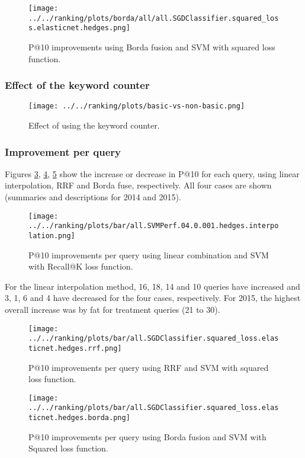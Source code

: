 \begin{figure}
\centerline{
  \texttt{[image: ../../ranking/plots/borda/all/all.SGDClassifier.squared\_loss.elasticnet.hedges.png]}
  }
  \caption{P@10 improvements using Borda fusion and SVM with squared loss function.}
  \label{borda-weight}
\end{figure}

\subsubsection{Effect of the keyword counter}
\begin{figure}[h!]
\centerline{
  \texttt{[image: ../../ranking/plots/basic-vs-non-basic.png]}
  }
  \caption{Effect of using the keyword counter.}
  \label{basic-effect-plot}
\end{figure}

\subsubsection{Improvement per query}

Figures \ref{interp-query}, \ref{rrf-query}, \ref{borda-query} show the increase or decrease in P@10 for each query,
using linear interpolation, RRF and Borda fuse, respectively. All four cases are shown (summaries and descriptions for 2014 and 2015).

\begin{figure}
\centerline{
  \texttt{[image: ../../ranking/plots/bar/all.SVMPerf.04.0.001.hedges.interpolation.png]}
  }
  \caption{P@10 improvements per query using linear combination and SVM with Recall@K loss function.}
  \label{interp-query}
\end{figure}

For the linear interpolation method, 16, 18, 14 and 10 queries have increased and 3, 1, 6 and 4 have decreased
for the four cases, respectively. For 2015, the highest overall increase was by fat for treatment queries (21 to 30).

\begin{figure}
\centerline{
  \texttt{[image: ../../ranking/plots/bar/all.SGDClassifier.squared\_loss.elasticnet.hedges.rrf.png]}
  }
  \caption{P@10 improvements per query using RRF and SVM with squared loss function.}
  \label{rrf-query}
\end{figure}

\begin{figure}
\centerline{
  \texttt{[image: ../../ranking/plots/bar/all.SGDClassifier.squared\_loss.elasticnet.hedges.borda.png]}
  }
  \caption{P@10 improvements per query using Borda fusion and SVM with Squared loss function.}
  \label{borda-query}
\end{figure}


